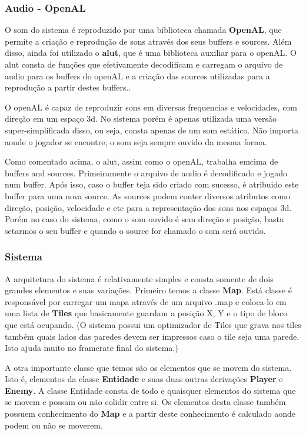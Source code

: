 \subsubsection{Audio - OpenAL}\label{openal}
O som do sistema é reproduzido por uma biblioteca chamada \textbf{OpenAL}, que permite a criação e reprodução de sons através dos seus buffers e sources. Além disso, ainda foi utilizado o \textbf{alut}, que é uma biblioteca auxiliar para o openAL. 
	O alut consta de funções que efetivamente decodificam e carregam o arquivo de audio para os buffers do openAL e a criação das sources utilizadas para a reprodução a partir destes buffers..

	O openAL é capaz de reproduzir sons em diversas frequencias e velocidades, com direção em um espaço 3d. No sistema porém é apenas utilizada uma versão super-simplificada disso, ou seja, consta apenas de um som estático. Não importa aonde o jogador se encontre, o som seja sempre ouvido da mesma forma.

	Como comentado acima, o alut, assim como o openAL, trabalha emcima de buffers and sources. Primeiramente o arquivo de audio é decodificado e jogado num buffer. Após isso, caso o buffer teja sido criado com sucesso, é atribuido este buffer para uma nova source. 
	As sources podem conter diversos atributos como direção, posição, velocidade e etc para a representação dos sons nos espaços 3d. Porém no caso do sistema, como o som ouvido é sem direção e posição, basta setarmos o seu buffer e quando o source for chamado o som será ouvido.
	
\subsubsection{Sistema}\label{system-arq}

	
A arquitetura do sistema é relativamente simples e consta somente de dois grandes elementos e suas variações.
	Primeiro temos a classe \textbf{Map}. Está classe é responsável por carregar um mapa através de um arquivo .map e coloca-lo em uma lista de \textbf{Tiles} que basicamente guardam a posição X, Y e o tipo de bloco que está ocupando. (O sistema possui um optimizador de Tiles que grava nos tiles também quais lados das paredes devem ser impressos caso o tile seja uma parede. Isto ajuda muito no framerate final do sistema.)

	A otra importante classe que temos são os elementos que se movem do sistema. Isto é, elementos da classe \textbf{Entidade} e suas duas outras derivações \textbf{Player} e  \textbf{Enemy}.
	A classe Entidade consta de todo e quaisquer elementos do sistema que se movem e possam ou não colidir entre si. Os elementos desta classe também possuem conhecimento do \textbf{Map} e a partir deste conhecimento é calculado aonde podem ou não se moverem.

